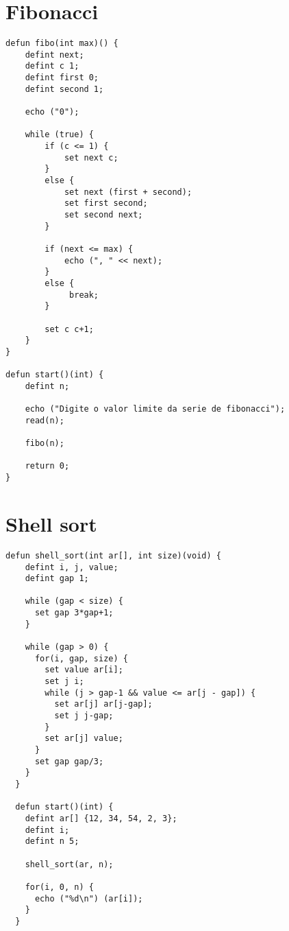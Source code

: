 \documentclass[
  12pt,				%
  oneside,			%
  a4paper,			%
  english,			%
  french,				%
  spanish,			%
  brazil,				%
]{abntex2}
\begin{document}
\section{Fibonacci}
\label{sec:fibonacci}

\begin{lstlisting}[label=code:fibonacci,caption=Programa Fibonacci]
defun fibo(int max)() {
    defint next;
    defint c 1;
    defint first 0;
    defint second 1;

    echo ("0");
    
    while (true) {
        if (c <= 1) {
            set next c;
        }
        else {
            set next (first + second);
            set first second;
            set second next;
        }

        if (next <= max) {
            echo (", " << next);
        }
        else {
             break;
        }
        
        set c c+1;
    }
}

defun start()(int) {
    defint n;

    echo ("Digite o valor limite da serie de fibonacci");
    read(n);

    fibo(n);

    return 0;
}
\end{lstlisting}

\section{Shell sort}
\label{sec:shell-sort}

\begin{lstlisting}[label=code:shell-sort,caption=Programa do shell
  sort]
  defun shell_sort(int ar[], int size)(void) {
    defint i, j, value;
    defint gap 1;
    
    while (gap < size) {
      set gap 3*gap+1;
    }

    while (gap > 0) {
      for(i, gap, size) {
        set value ar[i];
        set j i;
        while (j > gap-1 && value <= ar[j - gap]) {
          set ar[j] ar[j-gap];
          set j j-gap;
        }
        set ar[j] value;
      }
      set gap gap/3;
    }
  }

  defun start()(int) {
    defint ar[] {12, 34, 54, 2, 3};
    defint i;
    defint n 5;

    shell_sort(ar, n);

    for(i, 0, n) {
      echo ("%d\n") (ar[i]);
    }
  }

\end{lstlisting}
\end{document}
